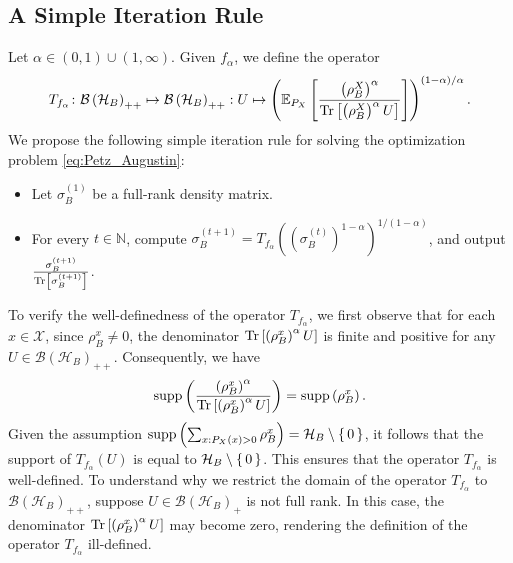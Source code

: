 \documentclass{article}
\DeclareMathOperator{\supp}{supp}
\begin{document}
\subsection{A Simple Iteration Rule}
\label{subsec:CohenIteration}


Let $\alpha\in(0,1)\cup(1,\infty)$. 
Given $f_{\alpha}$, we define the operator
\begin{equation}
    \label{eq:CohenIteration}
    T_{f_{\alpha}} \colon \mathcal{B}\left(\mathcal{H}_B\right)_{++}\mapsto\mathcal{B}\left(\mathcal{H}_B\right)_{++}:U\mapsto\left(\mathbb{E}_{P_X}\left[\frac{ \left(\rho_B^X\right)^\alpha}{ \Tr\left[ \left(\rho_B^X\right)^\alpha U \right] }\right]\right)^{(1-\alpha)/\alpha}.
\end{equation}
We propose the following simple iteration rule for solving the optimization problem \eqref{eq:Petz_Augustin}:  
\begin{itemize}
\item Let $\sigma_B^{(1)}$ be a full-rank density matrix. 
\item For every $t \in \mathbb{N}$, compute $\sigma_B^{(t + 1)} = T_{f_{\alpha}} \left(\left( \sigma_B^{(t)}\right)^{1-\alpha} \right)^{1/(1-\alpha)}$, and output $\frac{\sigma_B^{(t + 1)}}{\Tr\left[\sigma_B^{(t + 1)}\right]}$. 
\end{itemize} 

To verify the well-definedness of the operator $T_{f_{\alpha}}$, we first observe that
for each $x\in\mathcal{X}$, since $\rho_B^x\neq 0$, the denominator $\Tr\left[ \left(\rho_B^x\right)^\alpha U \right]$ is finite and positive 
for any $U\in\mathcal{B}\left(\mathcal{H}_B\right)_{++}$.
Consequently, we have 
\begin{align}
    \supp\left(\frac{\left(\rho_B^x\right)^{\alpha}}{\Tr\left[ \left(\rho_B^x\right)^\alpha U \right]}\right)
    =\supp\left(\rho_B^x\right).
\end{align}
Given the assumption $\supp\left(\sum_{x:P_X(x)>0}\rho_B^x\right) = \mathcal{H}_B \setminus \set{0}$, it follows that the support of $T_{f_{\alpha}}(U)$ is equal to $\mathcal{H}_B\setminus\set{0}$. 
This ensures that the operator $T_{f_{\alpha}}$ is well-defined. 
To understand why we restrict the domain of the operator $T_{f_{\alpha}}$ to $\mathcal{B}\left(\mathcal{H}_B\right)_{++}$, suppose $U\in\mathcal{B}\left(\mathcal{H}_B\right)_{+}$ is not full rank.
In this case, the denominator $\Tr\left[ \left(\rho_B^x\right)^\alpha U \right]$ may become zero, rendering the definition of the operator $T_{f_{\alpha}}$ ill-defined.
\end{document}
